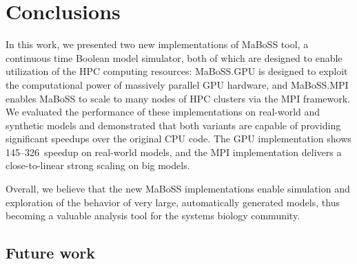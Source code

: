 \documentclass[sn-mathphys-num]{sn-jnl}%
\begin{document}



\section{Conclusions}

In this work, we presented two new implementations of MaBoSS tool, a continuous time Boolean model simulator, both of which are designed to enable utilization of the HPC computing resources: MaBoSS.GPU is designed to exploit the computational power of massively parallel GPU hardware, and MaBoSS.MPI enables MaBoSS to scale to many nodes of HPC clusters via the MPI framework. We evaluated the performance of these implementations on real-world and synthetic models and demonstrated that both variants are capable of providing significant speedups over the original CPU code. The GPU implementation shows 145--326\texttimes\ speedup on real-world models, and the MPI implementation delivers a close-to-linear strong scaling on big models.

Overall, we believe that the new MaBoSS implementations enable simulation and exploration of the behavior of very large, automatically generated models, thus becoming a valuable analysis tool for the systems biology community.

\subsection{Future work} 
\end{document}
